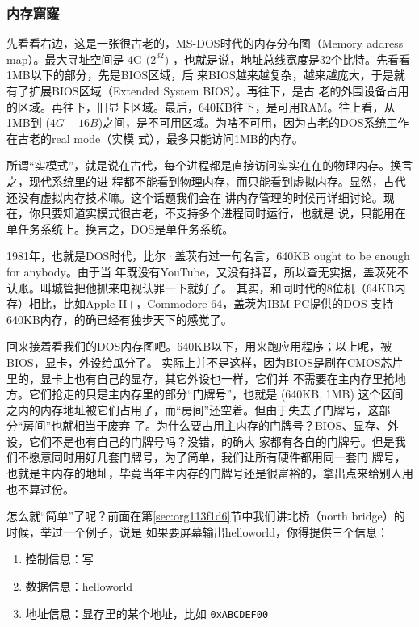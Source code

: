 \documentclass{wx672ctexart}
\newcommand\mpic[1]{%
  \marginpar{\texttt{[image: thumbnails/\#1]}}}
\begin{document}
\subsubsection{内存窟窿}
\label{sec:orgaa551b4}

\mpic{pg_0026}先看看右边，这是一张很古老的，MS-DOS时代的内存分布图（Memory address map）。最大寻址空间是
4G (\(2^{32}\)) ，也就是说，地址总线宽度是32个比特。先看看1MB以下的部分，先是BIOS区域，后
来BIOS越来越复杂，越来越庞大，于是就有了扩展BIOS区域（Extended System BIOS）。再往下，是古
老的外围设备占用的区域。再往下，旧显卡区域。最后，640KB往下，是可用RAM。往上看，从1MB到
(\(4G-16B\))之间，是不可用区域。为啥不可用，因为古老的DOS系统工作在古老的real mode（实模
式），最多只能访问1MB的内存。

所谓“实模式”，就是说在古代，每个进程都是直接访问实实在在的物理内存。换言之，现代系统里的进
程都不能看到物理内存，而只能看到虚拟内存。显然，古代还没有虚拟内存技术嘛。这个话题我们会在
讲内存管理的时候再详细讨论。现在，你只要知道实模式很古老，不支持多个进程同时运行，也就是
说，只能用在单任务系统上。换言之，DOS是单任务系统。

1981年，也就是DOS时代，比尔·盖茨有过一句名言，640KB ought to be enough for anybody。由于当
年既没有YouTube，又没有抖音，所以查无实据，盖茨死不认账。叫城管把他抓来电视认罪一下就好了。
其实，和同时代的8位机（64KB内存）相比，比如Apple II+，Commodore 64，盖茨为IBM PC提供的DOS
支持640KB内存，的确已经有独步天下的感觉了。

回来接着看我们的DOS内存图吧。640KB以下，用来跑应用程序；以上呢，被BIOS，显卡，外设给瓜分了。
实际上并不是这样，因为BIOS是刷在CMOS芯片里的，显卡上也有自己的显存，其它外设也一样，它们并
不需要在主内存里抢地方。它们抢走的只是主内存里的部分“门牌号”，也就是 (640KB, 1MB) 这个区间
之内的内存地址被它们占用了，而“房间”还空着。但由于失去了门牌号，这部分“房间”也就相当于废弃
了。为什么要占用主内存的门牌号？BIOS、显存、外设，它们不是也有自己的门牌号吗？没错，的确大
家都有各自的门牌号。但是我们不愿意同时用好几套门牌号，为了简单，我们让所有硬件都用同一套门
牌号，也就是主内存的地址，毕竟当年主内存的门牌号还是很富裕的，拿出点来给别人用也不算过份。

怎么就“简单”了呢？前面在第\ref{sec:org113f1d6}节中我们讲北桥（north bridge）的时候，举过一个例子，说是
如果要屏幕输出helloworld，你得提供三个信息：
\begin{enumerate}
\item 控制信息：写
\item 数据信息：helloworld
\item 地址信息：显存里的某个地址，比如 \texttt{0xABCDEF00}
\end{enumerate}
\end{document}
